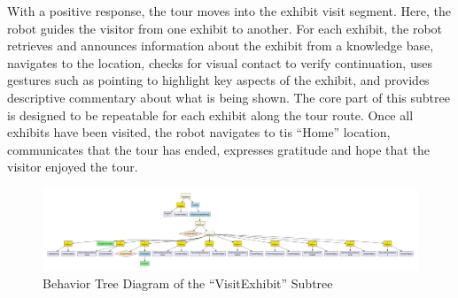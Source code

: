 \documentclass{CSSRforAfrica}
\begin{document}
With a positive response, the tour moves into the exhibit visit segment. Here, the robot guides the visitor from one exhibit to another. For each exhibit, the robot retrieves and announces information about the exhibit from a knowledge base, navigates to the location, checks for visual contact to verify continuation, uses gestures such as pointing to highlight key aspects of the exhibit, and provides descriptive commentary about what is being shown. The core part of this subtree is designed to be repeatable for each exhibit along the tour route. Once all exhibits have been visited, the robot navigates to tis ``Home'' location, communicates that the tour has ended, expresses gratitude and hope that the visitor enjoyed the tour.
\begin{landscape}
  \setlength{\topmargin}{-1.5cm}
  \setlength{\footskip}{4cm}  
  \vspace{3cm}
  \begin{figure}[H]
    \hspace{-3.55cm} %
    \includegraphics[width=1.25\linewidth]{./diagrams/visit.pdf}
    \caption{Behavior Tree Diagram of the ``VisitExhibit'' Subtree}
    \label{fig:visit_diagram}
  \end{figure}
\end{landscape}
\end{document}
